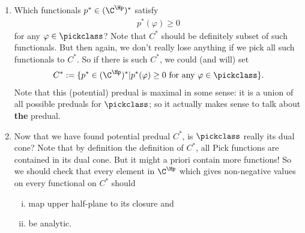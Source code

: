 \begin{enumerate}
	\item Which functionals $p^{*} \in (\C^{\Hp})^{*}$ satisfy
	\begin{align*}
		p^{*}(\varphi) \geq 0
	\end{align*}
	for any $\varphi \in \pickclass$? Note that $C^{*}$ should be definitely subset of such functionals. But then again, we don't really lose anything if we pick all such functionals to $C^{*}$. So if there is such $C^{*}$, we could (and will) set
	\begin{align*}
		C^{*} := \{p^{*} \in (\C^{\Hp})^{*} | p^{*}(\varphi) \geq 0 \text{ for any $\varphi \in \pickclass$}\}.
	\end{align*}
	Note that this (potential) predual is maximal in some sense: it is a union of all possible preduals for $\pickclass$; so it actually makes sense to talk about \textbf{the} predual.
	\item Now that we have found potential predual $C^{*}$, is $\pickclass$ really its dual cone? Note that by definition the definition of $C^{*}$, all Pick functions are contained in its dual cone. But it might a priori contain more functions! So we should check that every element in $\C^{\Hp}$ which gives non-negative values on every functional on $C^{*}$ should
	\begin{enumerate}[(i)]
		\item map upper half-plane to its closure and
		\item be analytic.
	\end{enumerate}
\end{enumerate}

\begin{comment}
To further highlight the step $3$, let's return to the realm of $k$-tone functions for a while. Recall that we set out to define $k$-tone functions as a set of functions that are more or less functions with non-negative $k$'th derivative. So, why not just define them as the set of functions with non-negative $k$'th derivative? The problem is that such functions are rather fragile. They are, for instance, not closed under pointwise convergence. Now, one could try to run the above steps for such functions. Let's say we are investigating $k$-tone functions on $(a, b)$. At step $1$ one would observe that one should think about $(\R^{(a, b)})^{*}$ as some kind of piecewise polynomial functions. At step $2$ one could choose non-negative such functions as $C^{*}$. Or some subset of them: we chose Peano kernels. But at step $3$ there's a problem: we get more functions.
\end{comment}

